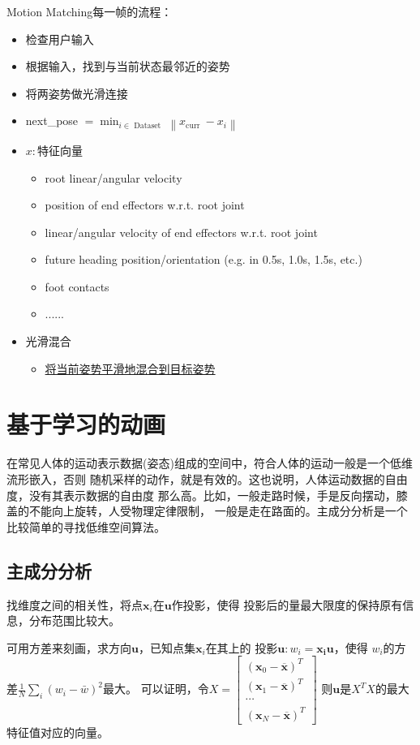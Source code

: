 \documentclass[lang=cn,newtx,10pt,scheme=chinese]{elegantbook}
\begin{document}
Motion Matching每一帧的流程：
\begin{itemize}
  \setlength{\itemindent}{2em}
  \item 检查用户输入
  \item 根据输入，找到与当前状态最邻近的姿势
  \item 将两姿势做光滑连接
  \item next\_pose $=\min _{i \in \text { Dataset }}\left\|x_{\text {curr }}-x_i\right\|$
  \item $x:\text{特征向量}$ \begin{itemize}
    \item root linear/angular velocity
    \item position of end effectors w.r.t. root joint
    \item linear/angular velocity of end effectors w.r.t. root joint
    \item future heading position/orientation (e.g. in 0.5s, 1.0s, 1.5s, etc.)
    \item foot contacts
    \item ......
  \end{itemize}
  \item 光滑混合 \begin{itemize}
    \item \href{https://www.theorangeduck.com/page/spring-roll-call}{将当前姿势平滑地混合到目标姿势}
  \end{itemize} 
\end{itemize}

\section{基于学习的动画}
在常见人体的运动表示数据(姿态)组成的空间中，符合人体的运动一般是一个低维流形嵌入，否则
随机采样的动作，就是有效的。这也说明，人体运动数据的自由度，没有其表示数据的自由度
那么高。比如，一般走路时候，手是反向摆动，膝盖的不能向上旋转，人受物理定律限制，
一般是走在路面的。主成分分析是一个比较简单的寻找低维空间算法。

\subsection{主成分分析}
找维度之间的相关性，将点$\boldsymbol{x}_i$在$\boldsymbol{u}$作投影，使得
投影后的量最大限度的保持原有信息，分布范围比较大。

可用方差来刻画，求方向$\boldsymbol{u}$，已知点集$\boldsymbol{x}_i$在其上的
投影$\boldsymbol{u}:w_i=\boldsymbol{x_i}\boldsymbol{u}$，使得
$w_i$的方差$\frac{1}{N}\sum_{i}(w_i - \bar{w})^2$最大。
可以证明，令$X=\left[\begin{array}{c}
  \left(\boldsymbol{x}_0-\overline{\boldsymbol{x}}
  \right)^T \\ \left(\boldsymbol{x}_1-
  \overline{\boldsymbol{x}}\right)^T 
  \\ \cdots \\ \left(\boldsymbol{x}_N-\overline{\boldsymbol{x}}
  \right)^T\end{array}\right]$
则$\boldsymbol{u}$是$X^T X$的最大特征值对应的向量。
\end{document}
